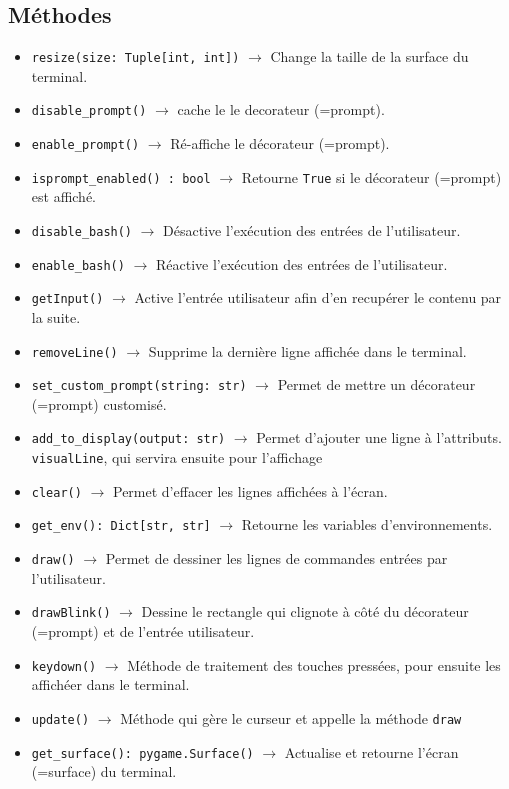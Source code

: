 \documentclass{report}
\begin{document}
\subsection*{Méthodes}
\begin{itemize}
  \item \texttt{resize(size: Tuple[int, int])}		$\rightarrow$ Change la taille de la surface du terminal.
  \item \texttt{disable_prompt()}		$\rightarrow$  cache le le decorateur (=prompt).
  \item \texttt{enable_prompt()}		$\rightarrow$ Ré-affiche le décorateur (=prompt).
  \item \texttt{isprompt_enabled() : bool}		$\rightarrow$ Retourne \texttt{True} si le décorateur (=prompt) est affiché.
  \item \texttt{disable_bash()}		$\rightarrow$ Désactive l'exécution des entrées de l'utilisateur.
  \item \texttt{enable_bash()}		$\rightarrow$ Réactive l'exécution des entrées de l'utilisateur.
  \item \texttt{getInput()}		$\rightarrow$ Active l’entrée utilisateur afin d'en recupérer le contenu par la suite.
  \item \texttt{removeLine()}		$\rightarrow$ Supprime la dernière ligne affichée dans le terminal.
  \item \texttt{set_custom_prompt(string: str)}		$\rightarrow$ Permet de mettre un décorateur (=prompt) customisé.
  \item \texttt{add_to_display(output: str)}		$\rightarrow$ Permet d’ajouter une ligne à l’attributs. \texttt{visualLine}, qui servira ensuite pour l’affichage
  \item \texttt{clear()} $\rightarrow$ Permet d’effacer les lignes affichées à l’écran.
  \item \texttt{get_env(): Dict[str, str]}		$\rightarrow$ Retourne les variables d'environnements.
  \item \texttt{draw()}	$\rightarrow$ Permet de dessiner les lignes de commandes entrées par l’utilisateur.
  \item \texttt{drawBlink()}		$\rightarrow$ Dessine le rectangle qui clignote à côté du décorateur (=prompt) et de l'entrée utilisateur.
  \item \texttt{keydown()}		$\rightarrow$ Méthode de traitement des touches pressées, pour ensuite les affichéer dans le terminal.
  \item \texttt{update()}		$\rightarrow$  Méthode qui gère le curseur et appelle la méthode \texttt{draw}
  \item \texttt{get_surface(): pygame.Surface()}		$\rightarrow$ Actualise et retourne l'écran (=surface) du terminal.
\end{itemize}
\newpage
\end{document}
